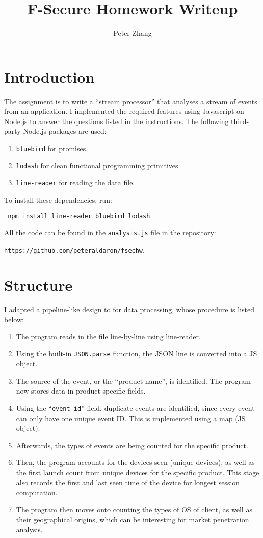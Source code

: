 \documentclass[12pt,letter]{article}
\newcommand{\be}{\begin{enumerate}}
\newcommand{\ee}{\end{enumerate}}
\begin{document}
  \title{F-Secure Homework Writeup}
  \author{Peter Zhang}
  \maketitle
  \section{Introduction}
  The assignment is to write a ``stream processor'' that analyses a stream of
  events from an application. I implemented the required features using
  Javascript on Node.js to answer the questions listed in the instructions. The
  following third-party Node.js packages are used:
  \be
  \item \texttt{bluebird} for promises.
  \item \texttt{lodash} for clean functional programming primitives.
  \item \texttt{line-reader} for reading the data file.
  \ee
  To install these dependencies, run:
  \begin{center}
      \texttt{
      npm install line-reader bluebird lodash
        }
  \end{center}

  All the code can be found in the \texttt{analysis.js} file in the repository:
  \begin{center}
  \texttt{https://github.com/peteraldaron/fsechw}.
  \end{center}

  \section{Structure}
  I adapted a pipeline-like design to for data processing, whose procedure is
  listed below:
  \be
  \item The program reads in the file line-by-line using line-reader.
  \item Using the built-in \texttt{JSON.parse} function, the JSON line is
      converted into a JS object.
  \item The source of the event, or the ``product name'', is identified. The
      program now stores data in product-specific fields.
  \item Using the ``\texttt{event\_id}'' field, duplicate events are identified,
      since every event can only have one unique event ID. This is implemented
      using a map (JS object).
  \item Afterwards, the types of events are being counted for the specific
      product.
  \item Then, the program accounts for the devices seen (unique devices), as well as the first
      launch count from unique devices for the specific product. This stage also
      records the first and last seen time of the device for longest session
      computation.
  \item The program then moves onto counting the types of OS of client, as well
      as their geographical origins, which can be interesting for market
      penetration analysis.
  \ee
\end{document}
